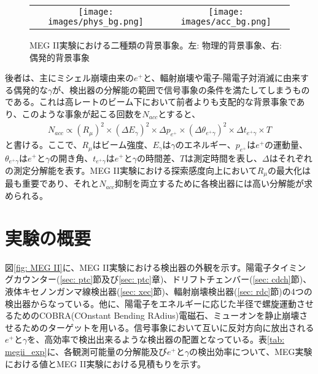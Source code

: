 \documentclass[Yonemoto_master.tex]{subfiles}
\begin{document}
\begin{figure}[h]
    \begin{tabular}{cc}
      \begin{minipage}[t]{0.45\hsize}
        \raggedleft
        \texttt{[image: images/phys\_bg.png]}
      \end{minipage} &
      \begin{minipage}[t]{0.45\hsize}
        \raggedright
        \texttt{[image: images/acc\_bg.png]}
      \end{minipage}
    \end{tabular}
    \caption{MEG II実験における二種類の背景事象。左: 物理的背景事象、右: 偶発的背景事象}
    \label{fig: bg}
\end{figure}

後者は、主にミシェル崩壊由来の$e^+$と、輻射崩壊や電子-陽電子対消滅に由来する偶発的な$\gamma$が、検出器の分解能の範囲で信号事象の条件を満たしてしまうものである。これは高レートのビーム下において前者よりも支配的な背景事象であり、このような事象が起こる回数を$N_{acc}$とすると、
\begin{align}
N_{acc} \propto (R_\mu)^2 \times (\Delta E_\gamma)^2 \times \Delta p_{e^+} \times (\Delta \theta_{e^+ \gamma})^2 \times \Delta t_{e^+ \gamma} \times T
\end{align}
と書ける。ここで、$R_\mu$はビーム強度、$E_\gamma$は$\gamma$のエネルギー、$p_{e^+}$は$e^+$の運動量、$\theta_{e^+ \gamma}$は$e^+$と$\gamma$の開き角、$t_{e^+ \gamma}$は$e^+$と$\gamma$の時間差、$T$は測定時間を表し、$\Delta$はそれぞれの測定分解能を表す。MEG II実験における探索感度向上において$R_\mu$の最大化は最も重要であり、それと$N_{acc}$抑制を両立するために各検出器には高い分解能が求められる。


\section{実験の概要}
図\ref{fig: MEG II}に、MEG II実験における検出器の外観を示す。陽電子タイミングカウンター(\ref{sec: ptc}節及び\ref{sec: ptc}章)、ドリフトチェンバー(\ref{sec: cdch}節)、液体キセノンガンマ線検出器(\ref{sec: xec}節)、輻射崩壊検出器(\ref{sec: rdc}節)の4つの検出器からなっている。他に、陽電子をエネルギーに応じた半径で螺旋運動させるためのCOBRA(COnstant Bending RAdius)電磁石、ミューオンを静止崩壊させるためのターゲットを用いる。信号事象において互いに反対方向に放出される$e^+$と$\gamma$を、高効率で検出出来るような検出器の配置となっている。表\ref{tab: megii_exp}に、各観測可能量の分解能及び$e^+$と$\gamma$の検出効率について、MEG実験における値とMEG II実験における見積もりを示す。
\end{document}
